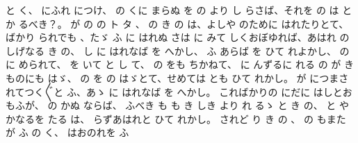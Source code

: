 と
く、
にふれ
につけ、
の
くに
まらぬ
を
の
より
し
らさば、それを
の
は
とか
るべき？。
が
の
の
ト
タ
、
の
き
の
は、よしや
のために
はれたりとて、
ばかり
られでも
、たゞ
ふ
に
はれぬ
さは
に
みて
しくおぼゆれば、あはれ
の
しげなる
き
の、
し
に
はれなば
を
へかし、
ふ
あらば
を
ひて
れよかし、
の
に
められて、
を
いて
と
し
て、
の
をも
ちかねて、
に
んずるに
れる
の
が
きものにも
はゞ、
の
を
の
はゞとて、せめては
とも
ひて
れかし。
が
につまされてつく〴〵と
ふ、あゝ
に
はれなば
を
へかし。
こればかりの
にだに
はしとおもふが、
の
かぬ
ならば、
ふべき
も
も
き
しき
より
れ
るゝ
と
き
の、
と
やかなるを
たる
は、
らずあはれと
ひて
れかし。
されど
り
き
の
、
の
もまた
が
ふ
の
く、
はおのれを
ふ
